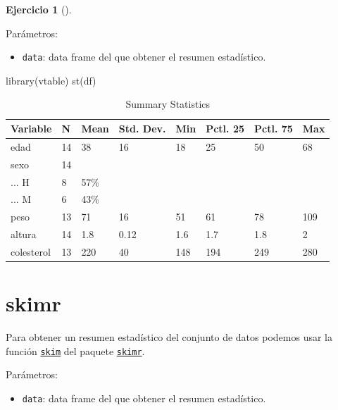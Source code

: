 \documentclass[
  a4paper,
]{scrreport}
\newenvironment{Shaded}{\begin{snugshade}}{\end{snugshade}}
\newcommand{\FunctionTok}[1]{\textcolor[rgb]{0.28,0.35,0.67}{#1}}
\newcommand{\NormalTok}[1]{\textcolor[rgb]{0.00,0.23,0.31}{#1}}
\providecommand{\tightlist}{%
  \setlength{\itemsep}{0pt}\setlength{\parskip}{0pt}}\usepackage{longtable,booktabs,array}
\theoremstyle{definition}
\newtheorem{exercise}{Ejercicio}[chapter]
\theoremstyle{remark}
\begin{document}
\begin{exercise}[]
\begin{enumerate}
\begin{tcolorbox}
  Parámetros:

  \begin{itemize}
  \tightlist
  \item
    \texttt{data}: data frame del que obtener el resumen estadístico.
  \end{itemize}

\begin{Shaded}
\begin{Highlighting}[]
\FunctionTok{library}\NormalTok{(vtable)}
\FunctionTok{st}\NormalTok{(df)}
\end{Highlighting}
\end{Shaded}

  \begin{table}

  \caption{Summary Statistics}
  \centering
  \begin{tabular}[t]{llllllll}
  \toprule
  Variable & N & Mean & Std. Dev. & Min & Pctl. 25 & Pctl. 75 & Max\\
  \midrule
  edad & 14 & 38 & 16 & 18 & 25 & 50 & 68\\
  sexo & 14 &  &  &  &  &  & \\
  ... H & 8 & 57\% &  &  &  &  & \\
  ... M & 6 & 43\% &  &  &  &  & \\
  peso & 13 & 71 & 16 & 51 & 61 & 78 & 109\\
  \addlinespace
  altura & 14 & 1.8 & 0.12 & 1.6 & 1.7 & 1.8 & 2\\
  colesterol & 13 & 220 & 40 & 148 & 194 & 249 & 280\\
  \bottomrule
  \end{tabular}
  \end{table}

  \section{skimr}

  Para obtener un resumen estadístico del conjunto de datos podemos usar
  la función
  \href{https://www.rdocumentation.org/packages/skimr/versions/2.2.1/topics/skim}{\texttt{skim}}
  del paquete
  \href{https://www.rdocumentation.org/packages/skimr}{\texttt{skimr}}.

  Parámetros:

  \begin{itemize}
  \tightlist
  \item
    \texttt{data}: data frame del que obtener el resumen estadístico.
  \end{itemize}


\end{tcolorbox}
\end{enumerate}
\end{exercise}
\end{document}
